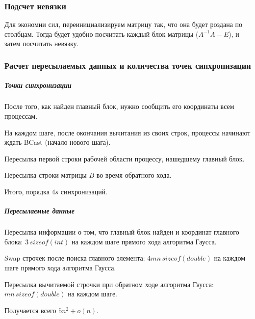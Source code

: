 \documentclass[12pt]{article}
\begin{document}
\subsubsection*{Подсчет невязки}
Для экономии сил, переинициализируем матрицу так, что она будет роздана по столбцам. Тогда будет удобно посчитать каждый блок матрицы ($A^{-1}A-E$), и затем посчитать невязку.
\subsubsection*{Расчет пересылаемых данных и количества точек синхронизации}

\subparagraph{Точки синхронизации}

\begin{itemize}

\begin{item}
  После того, как найден главный блок, нужно сообщить его координаты всем процессам.
\end{item}
\begin{item}
  На каждом шаге, после окончания вычитания из своих строк, процессы начинают ждать BCast (начало нового шага).
\end{item}
\begin{item}
  Пересылка первой строки рабочей области процессу, нашедшему главный блок.
\end{item}
\begin{item}
  Пересылка строки матрицы $B$ во время обратного хода.
\end{item}
\end{itemize}
 Итого, порядка $4s$ синхронизаций.
\subparagraph{Пересылаемые данные}

\begin{itemize}

\begin{item}
  Пересылка информации о том, что главный блок найден и координат главного блока: $3\,sizeof(int)$ на каждом шаге прямого хода алгоритма Гаусса.
\end{item}

\begin{item}
 Swap строчек после поиска главного элемента: $4mn\,sizeof(double)$ на каждом шаге прямого хода алгоритма Гаусса.
\end{item}

\begin{item}
  Пересылка вычитаемой строчки при обратном ходе алгоритма Гаусса: $mn\,sizeof(double)$ на каждом шаге.
\end{item}

\end{itemize}

Получается всего $5n^{2} + o(n)$.
\end{document}

